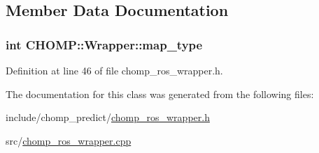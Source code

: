\subsection{Member Data Documentation}
\subsubsection[{\texorpdfstring{map\+\_\+type}{map_type}}]{\setlength{\rightskip}{0pt plus 5cm}int C\+H\+O\+M\+P\+::\+Wrapper\+::map\+\_\+type}\hypertarget{class_c_h_o_m_p_1_1_wrapper_a8e7d4dd9f8678e2752ef05e55a36ffe1}{}\label{class_c_h_o_m_p_1_1_wrapper_a8e7d4dd9f8678e2752ef05e55a36ffe1}


Definition at line 46 of file chomp\+\_\+ros\+\_\+wrapper.\+h.



The documentation for this class was generated from the following files\+:\begin{DoxyCompactItemize}
\item 
include/chomp\+\_\+predict/\hyperlink{chomp__ros__wrapper_8h}{chomp\+\_\+ros\+\_\+wrapper.\+h}\item 
src/\hyperlink{chomp__ros__wrapper_8cpp}{chomp\+\_\+ros\+\_\+wrapper.\+cpp}\end{DoxyCompactItemize}
